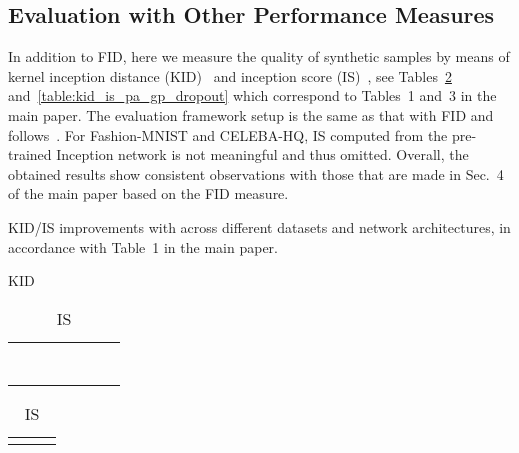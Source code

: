 \documentclass{article}
\begin{document}
\begin{center}
 \section{Evaluation with Other Performance Measures} \label{kid-is}
In addition to FID, here we measure the quality of synthetic samples by means of kernel inception distance (KID)~\cite{Binkowski2016MMDGAN} and inception score (IS)~\cite{Theis2016a}, see Tables~\ref{table:kid_is_one} and~\ref{table:kid_is_pa_gp_dropout} which correspond to Tables~1 and~3 in the main paper. The evaluation framework setup is the same as that with FID and follows~\cite{LucicEqualGANs,Kurach2018GANlandscape}. For Fashion-MNIST and CELEBA-HQ, IS computed from the pre-trained Inception network is not meaningful and thus omitted. Overall, the obtained results show consistent observations with those that are made in Sec.~4 of the main paper based on the FID measure.
\begin{table}[t!]
\setlength{\tabcolsep}{0.15em} 
	\renewcommand{\arraystretch}{1}
\centering
	\caption{KID/IS improvements with  across different datasets and network architectures, in accordance with Table~1 in the main paper.} \label{table:kid_is_one} \hspace{-1em}
	\begin{minipage}{0.6\textwidth}
		\caption*{KID}
		\begin{tabular}{l|c|cccc|c} 
		\rowcolor{verylightgray}
		\footnotesize{}{\text{}}	& \footnotesize{}{\text{}}& 
		\footnotesize{}{\text{}} & \footnotesize{}{\text{}} & \footnotesize{}{\text{}} & \footnotesize{}{\text{}}&\footnotesize{}{\text{}} \tabularnewline 	
		
		\text{} & \footnotesize{}{\xmark}& \text{\footnotesize} & \text{\footnotesize} & \text{\footnotesize} & \text{\footnotesize-} & \multirow{3}{*}{\text{\footnotesize}} \tabularnewline 	
		\text{} & \text{} & \text{\footnotesize} &  \text{\footnotesize} & \text{\footnotesize} & \text{\footnotesize-} \tabularnewline 
		\footnotesize{}\text{\cite{miyato2018spectral}}  & \text{} & \text{\footnotesize} &  \text{\footnotesize} & \text{\footnotesize} & \text{\footnotesize-} \tabularnewline 
		
		\arrayrulecolor{gray}	\hline \arrayrulecolor{verylightgray}
		
		\multirow{1}{*}{\text{}}	& \footnotesize{}{\xmark}& \text{\footnotesize-} & \text{\footnotesize} & \footnotesize{}{} &\footnotesize{}{} &\multirow{3}{*}{\text{\footnotesize}}   \tabularnewline 
		\text{}  & \text{} & \text{\footnotesize-}  & \text{\footnotesize} & \footnotesize{}{} & \text{\footnotesize}  \tabularnewline 
		\footnotesize{}\text{\cite{Zhang_SAGAN18}} & \text{} & \text{\footnotesize -}  & \text{\footnotesize} & \footnotesize{}{} & \text{\footnotesize} 
\end{tabular}	
	\end{minipage}
\hspace{3.5em}
\begin{minipage}{0.3\textwidth}
	\caption*{IS}
	\begin{tabular}{||cc|c} 
	\rowcolor{verylightgray}
	 \footnotesize{}{\text{}} &  \footnotesize{}{\text{}}&\footnotesize{}{\text{}} \tabularnewline 	
	

\end{tabular}
\end{minipage}
\end{table}
\end{center}
\end{document}
